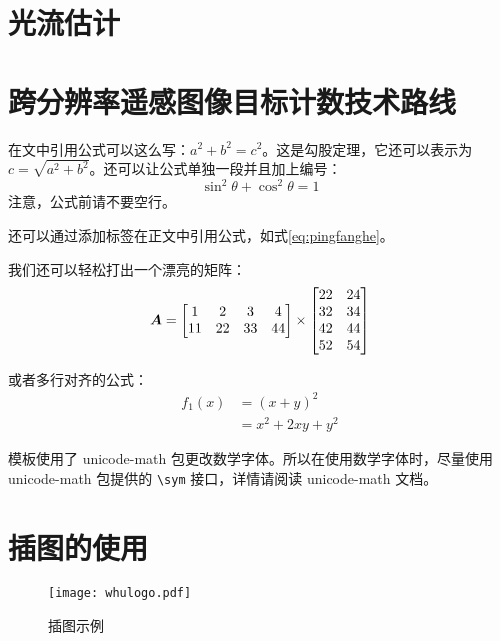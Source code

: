 \section{光流估计}

\section{跨分辨率遥感图像目标计数技术路线}
在文中引用公式可以这么写：\(a^2 + b^2 = c^2\)。这是勾股定理，它还可以表示为 \(c = \sqrt{a^2 + b^2}\)。还可以让公式单独一段并且加上编号：
\begin{equation}
  \sin^2{\theta} + \cos^2{\theta} = 1 \label{eq:pingfanghe}
\end{equation}
注意，公式前请不要空行。

还可以通过添加标签在正文中引用公式，如式\eqref{eq:pingfanghe}。

我们还可以轻松打出一个漂亮的矩阵：
\begin{equation}
  \vb*{A} =
  \begin{bmatrix}
    1  & 2  & 3  & 4  \\
    11 & 22 & 33 & 44 \\
  \end{bmatrix} \times
  \begin{bmatrix}
    22 & 24 \\
    32 & 34 \\
    42 & 44 \\
    52 & 54 \\
  \end{bmatrix}
\end{equation}

或者多行对齐的公式：
\begin{equation}
  \begin{aligned}
    f_1(x) & = (x + y)^2         \\
           & = x^2 + 2 x y + y^2
  \end{aligned}
\end{equation}

模板使用了 unicode-math 包更改数学字体。所以在使用数学字体时，尽量使用 unicode-math 包提供的 \verb|\sym| 接口，详情请阅读 unicode-math 文档。

\section{插图的使用}
\begin{figure}
  \centering
  \texttt{[image: whulogo.pdf]}
  \caption{插图示例}
  \label{fig:whu}
\end{figure}

